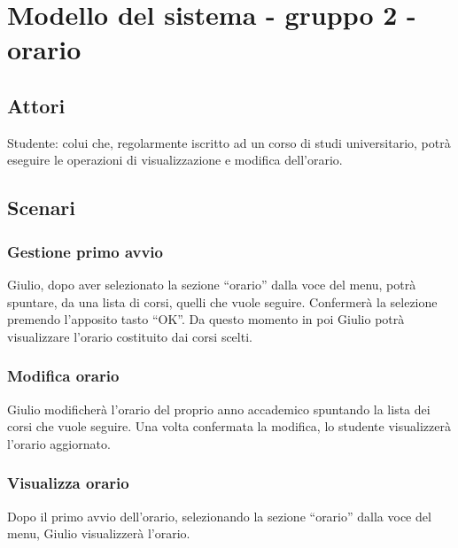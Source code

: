 
\chapter{Modello del sistema - gruppo 2 - orario}
\label{ref:modSistemaGruppo2-orario}


\section{Attori}
Studente: colui che, regolarmente iscritto ad un corso di studi universitario, potrà eseguire le operazioni di visualizzazione e modifica dell’orario.


\section{Scenari}

\subsection{Gestione primo avvio}

Giulio, dopo aver selezionato la sezione “orario” dalla voce del menu, potrà spuntare, da una lista di corsi, quelli che vuole seguire. Confermerà la selezione premendo l’apposito tasto “OK”. Da questo momento in poi Giulio potrà visualizzare l’orario costituito dai corsi scelti. 

\subsection{Modifica orario}

Giulio modificherà l’orario del proprio anno accademico spuntando la lista dei corsi che vuole seguire. Una volta confermata la modifica, lo studente visualizzerà l’orario aggiornato. 

\subsection{Visualizza orario}

Dopo il primo avvio dell’orario, selezionando la sezione “orario” dalla voce del menu, Giulio visualizzerà l’orario. 

